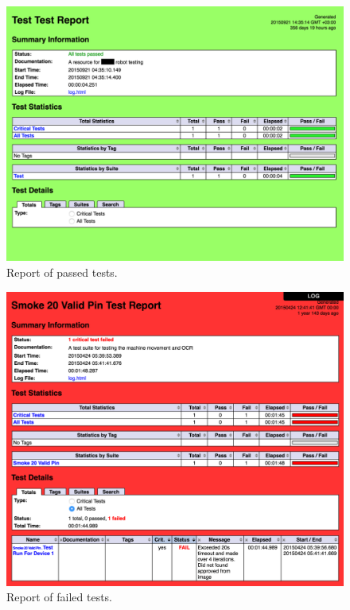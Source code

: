 \begin{figure}[ht]
  \begin{center}
    \includegraphics[width=.8\textwidth]{images/passed_report.png}
    \caption{Report of passed tests.}
    \label{fig:passed report}
  \end{center}
\end{figure}
\FloatBarrier

\begin{figure}[ht]
  \begin{center}
    \includegraphics[width=.8\textwidth]{images/failed_report.png}
    \caption{Report of failed tests.}
    \label{fig:failed report}
  \end{center}
\end{figure}
\FloatBarrier